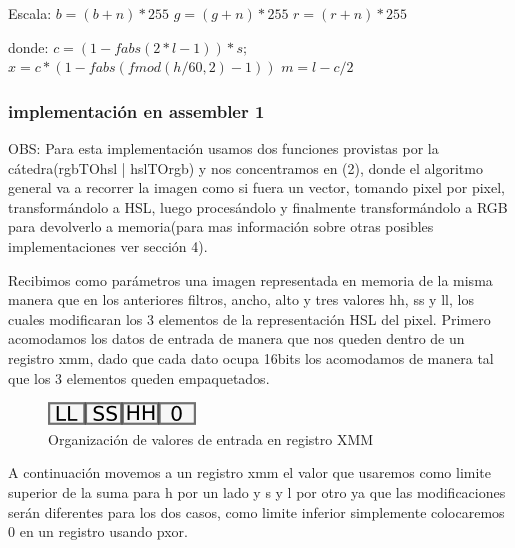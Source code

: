 \documentclass[a4paper]{article}
\begin{document}
\begin{enumerate}
		Escala:\newline
		$b = (b+n) * 255$\newline
		$g = (g+n) * 255$\newline
		$r = (r+n) * 255$\newline

		donde:\newline
		$c = ( 1 - fabs( 2*l - 1 )) * s;$\newline
		$x = c * ( 1 - fabs( fmod( h/60, 2 ) - 1 ) )$\newline
		$m = l - c / 2$\newline


\end{enumerate}

\subsubsection{implementación en assembler 1}
OBS: Para esta implementación usamos dos funciones provistas por la cátedra(rgbTOhsl | hslTOrgb) y nos concentramos en (2), donde el algoritmo general va a recorrer la imagen como si fuera un vector, tomando pixel por pixel, transformándolo a HSL, luego procesándolo y finalmente transformándolo a RGB para devolverlo a memoria(para mas información sobre otras posibles implementaciones ver sección 4).



Recibimos como parámetros una imagen representada en memoria de la misma manera que en los anteriores filtros, ancho, alto y tres valores hh, ss y ll, los cuales modificaran los 3 elementos de la representación HSL del pixel.
Primero acomodamos los datos de entrada de manera que nos queden dentro de un registro xmm, dado que cada dato ocupa 16bits los acomodamos de manera tal que los 3 elementos queden empaquetados.

\begin{figure}[H]
\centering
\includegraphics[scale=0.8]{imagenes/llsshh.png}
\caption{Organización de valores de entrada en registro XMM}
\label{lshValue6}
\end{figure}

A continuación movemos a un registro xmm el valor que usaremos como limite superior de la suma para h por un lado y s y l por otro ya que las modificaciones serán diferentes para los dos casos, como limite inferior simplemente colocaremos 0 en un registro usando pxor.
\end{document}
